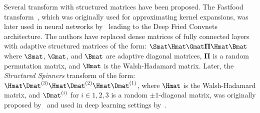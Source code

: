 Several transform with structured matrices have been proposed.
The Fastfood transform~\cite{le2013fastfood}, which was originally used for approximating kernel expansions, was later used in neural networks by~\citet{yang2015deep} leading to the Deep Fried Convnets architecture.
The authors have replaced dense matrices of fully connected layers with adaptive structured matrices of the form: $\Smat\Hmat\Gmat\mathbf{\Pi}\Hmat\Bmat$ where $\Smat$, $\Gmat$, and $\Bmat$ are adaptive diagonal matrices, $\mathbf{\Pi}$ is a random permutation matrix, and $\Hmat$ is the Walsh-Hadamard matrix.
Later, the \emph{Structured Spinners} transform of the form: $\Hmat\Dmat^{(3)} \Hmat\Dmat^{(2)} \Hmat\Dmat^{(1)}$, where $\Hmat$ is the Walsh-Hadamard matrix, and $\Dmat^{(i)}$ for $i \in {1, 2, 3}$ is a random $\pm1$-diagonal matrix, was originally proposed by~\citet{andoni2015practical} and used in deep learning settings by~\citet{bojarski2017structured}.

